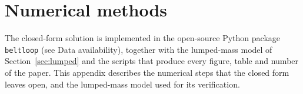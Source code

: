 \section{Numerical methods}\label{app:numerics}

The closed-form solution is implemented in the open-source Python package
\texttt{beltloop} (see Data availability), together with the lumped-mass model of
Section~\ref{sec:lumped} and the scripts that produce every figure, table and number
of the paper. This appendix describes the numerical steps that the closed form leaves
open, and the lumped-mass model used for its verification.

